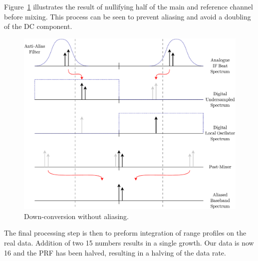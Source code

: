 \documentclass[a4paper,11pt]{report}
\begin{document}
Figure~\ref{fig:anti_alias_down_conversion} illustrates the result of nullifying half of the main and reference channel before mixing. This process can be seen to prevent aliasing and avoid a doubling of the DC component.
\begin{figure}[!ht]
    \begin{center}
        \includegraphics[width=\textwidth]{images/anti_alias_down_conversion}
        \caption{Down-conversion without aliasing.}
        \label{fig:anti_alias_down_conversion}
    \end{center}
\end{figure}

The final processing step is then to preform integration of range profiles on the real data. Addition of two \SI{15}{\bit} numbers results in a single \SI{}{\bit} growth. Our data is now \SI{16}{\bit} and the PRF has been halved, resulting in a halving of the data rate.
\end{document}
